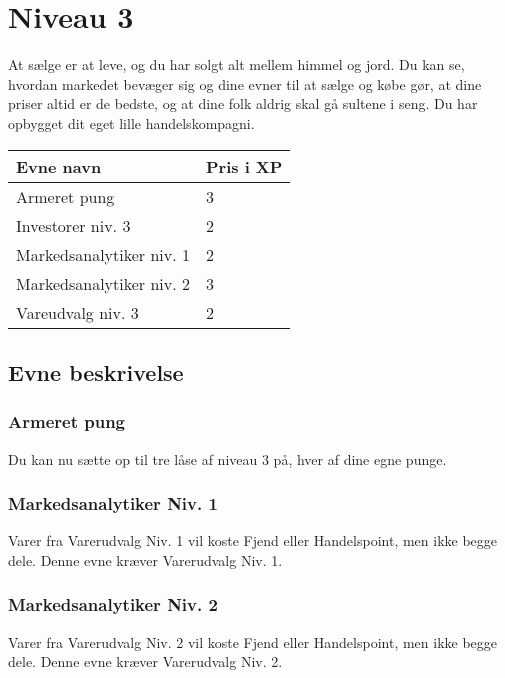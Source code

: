 \chapter*{Niveau 3}

At sælge er at leve, og du har solgt alt mellem himmel og jord. Du kan se, hvordan markedet bevæger sig og dine evner til at sælge og købe gør, at dine priser altid er de bedste, og at dine folk aldrig skal gå sultene i seng. Du har opbygget dit eget lille handelskompagni. 

\begin{table}[H]
    \centering
    \begin{tabular}{|p{}|p{}|}
    \rowcolor{cerulean!80}\hline
        Evne navn & Pris i XP \\\hline
        Armeret pung & 3\\\hline
        Investorer niv. 3& 2\\\hline
        Markedsanalytiker niv. 1& 2\\\hline
        Markedsanalytiker niv. 2& 3\\\hline
        Vareudvalg niv. 3& 2\\\hline
    \end{tabular}
\end{table}
\section*{Evne beskrivelse}

\subsection*{Armeret pung}
Du kan nu sætte op til tre låse af niveau 3 på, hver af dine egne punge.\\



\subsection*{Markedsanalytiker Niv. 1}
Varer fra Varerudvalg Niv. 1 vil koste Fjend eller Handelspoint, men ikke begge dele. Denne evne kræver Varerudvalg Niv. 1.\\

\subsection*{Markedsanalytiker Niv. 2}
Varer fra Varerudvalg Niv. 2 vil koste Fjend eller Handelspoint, men ikke begge dele. Denne evne kræver Varerudvalg Niv. 2.\\

